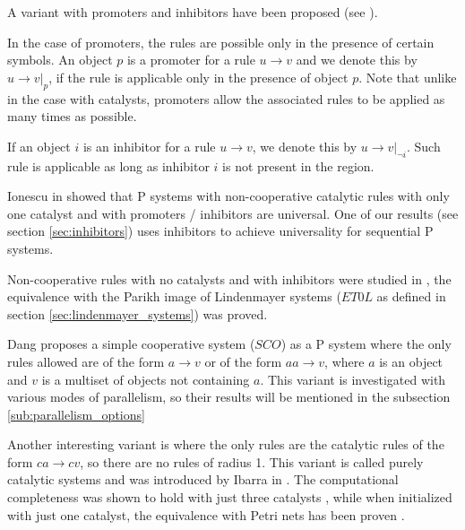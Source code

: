 A variant with promoters and inhibitors have been proposed (see \cite{Ionescu:jucs_10_5:on_p_systems_with}).


In the case of  promoters, the rules are possible only in the presence of certain symbols. An object $p$ is a promoter for a rule $u\rightarrow v$ and we denote this by $u\rightarrow v|_{p}$, if the rule is applicable only in the presence of object $p$. Note that unlike in the case with catalysts, promoters allow the associated rules to be applied as many times as possible.


If an object $i$ is an  inhibitor for a rule $u\rightarrow v$, we denote this by $u\rightarrow v|_{\neg i}$. Such rule is applicable as long as inhibitor $i$ is not present in the region.


Ionescu in \cite{Ionescu:jucs_10_5:on_p_systems_with} showed that P systems with non-cooperative catalytic rules with only one catalyst and with promoters / inhibitors are universal.
One of our results (see section \ref{sec:inhibitors}) uses inhibitors to achieve universality for sequential P systems.


Non-cooperative rules with no catalysts and with inhibitors were studied in \cite{Sburlan:2006:FurtherResultsPromotersInhibitors}, the equivalence with the Parikh image of Lindenmayer systems  ($ET0L$ as defined in section \ref{sec:lindenmayer_systems}) was proved.


Dang \cite{Ibarra04dang} proposes a simple cooperative system ($SCO$) as a P system where the only rules allowed are of the form $a\rightarrow v$ or of the form $aa\rightarrow v$, where $a$ is an object and $v$ is a multiset of objects not containing $a$. This variant is investigated with various modes of parallelism, so their results will be mentioned in the subsection \ref{sub:parallelism_options}


Another interesting variant is where the only rules are the catalytic rules of the form $ca\rightarrow cv$, so there are no rules of radius 1. This variant is called purely catalytic systems and was introduced by Ibarra in \cite{Ibarra:03:Catalytic}. The computational completeness was shown to hold with just three catalysts \cite{Freund2005TwoCatalysts}, while when initialized with just one catalyst, the equivalence with Petri nets has been proven \cite{Ibarra04Catalytic}.

